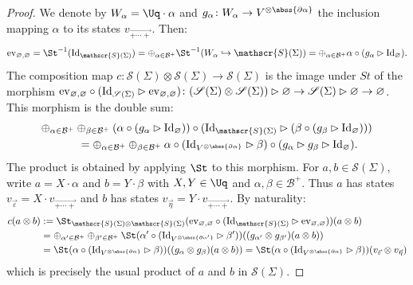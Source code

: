 \begin{proof}
 We denote by $W_\alpha = \Uq\cdot \alpha$ and $g_\alpha\colon W_\alpha \to V^{\otimes \abss{\partial \alpha}}$ the inclusion mapping $\alpha$ to its states $v_{\overrightarrow{+\cdots +}}$. Then:
 \[
 {\rm ev}_{\varnothing,\varnothing} =\St^{-1}({\rm Id}_{\mathscr{S}(\Sigma)}) = \oplus_{\alpha \in \mathcal{B}^+} \St^{-1}(W_\alpha \hookrightarrow \mathscr{S}(\Sigma)) = \oplus_{\alpha \in \mathcal{B}^+}\alpha \circ (g_\alpha \rhd {\rm Id}_\varnothing).
 \]
The composition map $c \colon \mathscr{S}(\Sigma) \otimes \mathscr{S}(\Sigma) \to \mathscr{S}(\Sigma)$ is the image under $St$ of the morphism ${\rm ev}_{\varnothing,\varnothing} \circ ({\rm Id}_{\mathscr{S}(\Sigma)} \rhd {\rm ev}_{\varnothing,\varnothing}) \colon (\mathscr{S}(\Sigma) \otimes \mathscr{S}(\Sigma))\rhd \varnothing \to \mathscr{S}(\Sigma) \rhd \varnothing\to\varnothing$. This morphism is the double sum:
\begin{gather*}
\oplus_{\alpha \in \mathcal{B}^+}\oplus_{\beta \in \mathcal{B}^+}(\alpha \circ (g_\alpha \rhd {\rm Id}_\varnothing))\circ ({\rm Id}_{\mathscr{S}(\Sigma)} \rhd (\beta \circ (g_\beta \rhd {\rm Id}_\varnothing)))
\\ \qquad
{}=\oplus_{\alpha \in \mathcal{B}^+}\oplus_{\beta \in \mathcal{B}^+}\alpha \circ ({\rm Id}_{V^{\otimes \abss{\partial \alpha}}}\rhd \beta) \circ (g_\alpha \rhd g_\beta \rhd {\rm Id}_\varnothing) .
\end{gather*}
The product is obtained by applying $\St$ to this morphism. For $a,b \in \mathscr{S}(\Sigma)$, write $a=X\cdot \alpha$ and $b=Y\cdot \beta$ with $X,Y \in \Uq$ and $\alpha,\beta \in \mathcal{B}^+$. Thus $a$ has states $v_{\vec{\varepsilon}} = X \cdot v_{\overrightarrow{+\cdots +}}$ and $b$ has states $v_{\vec{\eta}}=Y \cdot v_{\overrightarrow{+\cdots +}}$. By naturality:
\begin{align*}
c(a\otimes b) &:= \St_{\mathscr{S}(\Sigma)\otimes \mathscr{S}(\Sigma)}({\rm ev}_{\varnothing,\varnothing} \circ ({\rm Id}_{\mathscr{S}(\Sigma)} \rhd {\rm ev}_{\varnothing,\varnothing}))(a\otimes b)
\\
&= \oplus_{\alpha' \in \mathcal{B}^+}\oplus_{\beta' \in \mathcal{B}^+} \St(\alpha' \circ ({\rm Id}_{V^{\otimes \abss{\partial \alpha'}}}\rhd \beta'))((g_{\alpha'} \otimes g_{\beta'})(a \otimes b))
\\
& = \St(\alpha \circ ({\rm Id}_{V^{\otimes \abss{\partial \alpha}}}\rhd \beta))((g_\alpha \otimes g_\beta)(a \otimes b)) = \St(\alpha \circ ({\rm Id}_{V^{\otimes \abss{\partial \alpha}}}\rhd \beta))(v_{\vec{\varepsilon}} \otimes v_{\vec{\eta}})
\end{align*}
which is precisely the usual product of $a$ and $b$ in $\mathscr{S}(\Sigma)$.
\end{proof}
